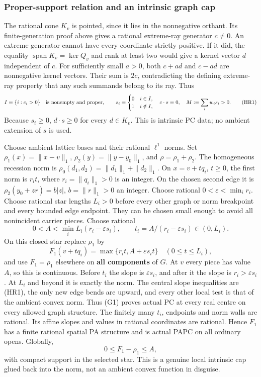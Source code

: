\documentclass[
  11pt,
]{article}
\begin{document}
\subsubsection{Proper-support relation and an intrinsic graph
cap}\label{proper-support-relation-and-an-intrinsic-graph-cap}

The rational cone \(K_v\) is pointed, since it lies in the nonnegative
orthant. Its finite-generation proof above gives a rational extreme-ray
generator \(c\ne0\). An extreme generator cannot have every coordinate
strictly positive. If it did, the equality
\(\operatorname{span}K_v=\ker Q_v\) and rank at least two would give a
kernel vector \(d\) independent of \(c\). For sufficiently small
\(a>0\), both \(c+ad\) and \(c-ad\) are nonnegative kernel vectors.
Their sum is \(2c\), contradicting the defining extreme-ray property
that any such summands belong to its ray. Thus \[
 I=\{i:c_i>0\}\quad\hbox{is nonempty and proper},\qquad
 s_i=\begin{cases}0&i\in I,\\1&i\notin I,\end{cases}
 \quad c\mathbin{\cdot}s=0,
 \quad M:=\sum_iw_is_i>0.                                  \tag{HR1}
\] Because \(s_i\geq0\), \(d\mathbin{\cdot}s\geq0\) for every
\(d\in K_v\). This is intrinsic PC data; no ambient extension of \(s\)
is used.

Choose ambient lattice bases and their rational \(\ell^1\) norms. Set
\(\rho_1(x)=\|x-v\|_1\), \(\rho_2(y)=\|y-y_0\|_1\), and
\(\rho=\rho_1+\rho_2\). The homogeneous recession norm is
\(\rho_0(d_1,d_2)=\|d_1\|_1+\|d_2\|_1\). On \(x=v+tq_i\), \(t\geq0\),
the first norm is \(r_it\), where \(r_i=\|q_i\|_1>0\) is an integer. On
the chosen second edge it is \(\rho_2(y_0+zr)=b|z|\), \(b=\|r\|_1>0\) an
integer. Choose rational \(0<\varepsilon<\min_i r_i\). Choose rational
star lengths \(L_i>0\) before every other graph or norm breakpoint and
every bounded edge endpoint. They can be chosen small enough to avoid
all nonincident carrier pieces. Choose rational \[
       0<A<\min_i L_i(r_i-\varepsilon s_i),\qquad
       t_i=A/(r_i-\varepsilon s_i)\in(0,L_i).                \tag{HR2}
\] On this closed star replace \(\rho_1\) by \[
 F_1(v+tq_i)=\max\{r_it,A+\varepsilon s_it\}\quad(0\leq t\leq L_i),
                                                               \tag{HR3}
\] and use \(F_1=\rho_1\) elsewhere on \textbf{all components} of \(G\).
At \(v\) every piece has value \(A\), so this is continuous. Before
\(t_i\) the slope is \(\varepsilon s_i\), and after it the slope is
\(r_i>\varepsilon s_i\). At \(L_i\) and beyond it is exactly the norm.
The central slope inequalities are (HR1), the only new edge bends are
upward, and every other local test is that of the ambient convex norm.
Thus (G1) proves actual PC at every real centre on every allowed graph
structure. The finitely many \(t_i\), endpoints and norm walls are
rational. Its affine slopes and values in rational coordinates are
rational. Hence \(F_1\) has a finite rational spatial PA structure and
is actual PAPC on all ordinary opens. Globally, \[
                0\leq F_1-\rho_1\leq A,                   \tag{HR4}
\] with compact support in the selected star. This is a genuine local
intrinsic cap glued back into the norm, not an ambient convex function
in disguise.
\end{document}
